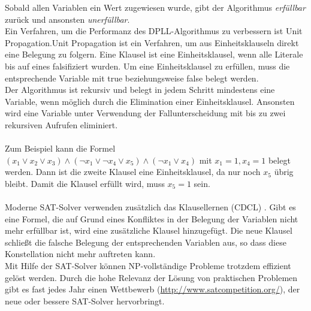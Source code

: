 \documentclass[a4,abstract=on]{scrartcl}
\begin{document}
Sobald allen Variablen ein Wert zugewiesen wurde, gibt der Algorithmus \emph{erfüllbar} zurück und ansonsten \emph{unerfüllbar}.\\
Ein Verfahren, um die Performanz des DPLL-Algorithmus zu verbessern ist Unit Propagation.Unit Propagation ist ein Verfahren, um aus Einheitsklauseln direkt eine Belegung zu folgern. Eine Klausel ist eine Einheitsklausel, wenn alle Literale bis auf eines falsifiziert wurden. Um eine Einheitsklausel zu erfüllen, muss die entsprechende Variable mit true beziehungsweise false belegt werden.\\
Der Algorithmus ist rekursiv und belegt in jedem Schritt mindestens eine Variable, wenn möglich durch die Elimination einer Einheitsklausel. Ansonsten wird eine Variable unter Verwendung der Fallunterscheidung mit bis zu zwei rekursiven Aufrufen eliminiert.\\
\ \\
Zum Beispiel kann die Formel $(x_1 \vee x_2 \vee x_3) \wedge (\neg x_1 \vee \neg x_4 \vee x_5) \wedge (\neg x_1 \vee x_4)$ mit $x_1=1, x_4=1$ belegt werden. Dann ist die zweite Klausel eine Einheitsklausel, da nur noch $x_5$ übrig bleibt. Damit die Klausel erfüllt wird, muss $x_5 = 1$ sein. \\
\ \\
Moderne SAT-Solver verwenden zusätzlich das Klausellernen (CDCL) \cite[vgl.][]{cdcl}. Gibt es eine Formel, die auf Grund eines Konfliktes in der Belegung der Variablen nicht mehr erfüllbar ist, wird eine zusätzliche Klausel hinzugefügt. Die neue Klausel schließt die falsche Belegung der entsprechenden Variablen aus, so dass diese Konstellation nicht mehr auftreten kann.\\
Mit Hilfe der SAT-Solver können NP-vollständige Probleme trotzdem effizient gelöst werden. Durch die hohe Relevanz der Lösung von praktischen Problemen gibt es fast jedes Jahr einen Wettbewerb (\url{http://www.satcompetition.org/}), der neue oder bessere SAT-Solver hervorbringt.

\end{document}
